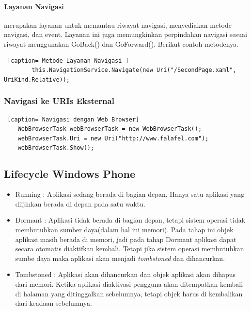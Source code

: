 \paragraph{Layanan Navigasi}
\label{subsubsec:Layanan Navigasi}
merupakan layanan untuk memantau riwayat navigasi, menyediakan metode navigasi, dan event. Layanan ini juga memungkinkan perpindahan navigasi sesuai riwayat menggunakan GoBack() dan GoForward(). Berikut contoh metodenya.

\begin{lstlisting} [caption= Metode Layanan Navigasi ]
		this.NavigationService.Navigate(new Uri("/SecondPage.xaml", UriKind.Relative));
\end{lstlisting}

\subsubsection{Navigasi ke URIs Eksternal}
\label{subsubsec:Navigasi ke URIs Eksternal}

\begin{lstlisting} [caption= Navigasi dengan Web Browser]
	WebBrowserTask webBrowserTask = new WebBrowserTask();
	webBrowserTask.Uri = new Uri("http://www.falafel.com");
	webBrowserTask.Show();
\end{lstlisting}

\subsection{Lifecycle Windows Phone}
\label{subsec:Lifecycle Windows Phone}

\begin{itemize}
	\item Running : Aplikasi sedang berada di bagian depan. Hanya satu aplikasi yang diijinkan berada di depan pada satu waktu.
	\item Dormant : Aplikasi tidak berada di bagian depan, tetapi sistem operasi tidak membutuhkan sumber daya(dalam hal ini memori). Pada tahap ini objek aplikasi masih berada di memori, jadi pada tahap Dormant aplikasi dapat secara otomatis diaktifkan kembali. Tetapi jika sistem operasi  membutuhkan sumbe daya maka aplikasi akan menjadi \textit{tombstoned} dan dihancurkan. 
	\item Tombstoned : Aplikasi akan dihancurkan dan objek aplikasi akan dihapus dari memori. Ketika aplikasi diaktivasi pengguna akan ditempatkan kembali di halaman yang ditinggalkan sebelumnya, tetapi objek harus di kembalikan dari keadaan sebelumnya.
\end{itemize}

